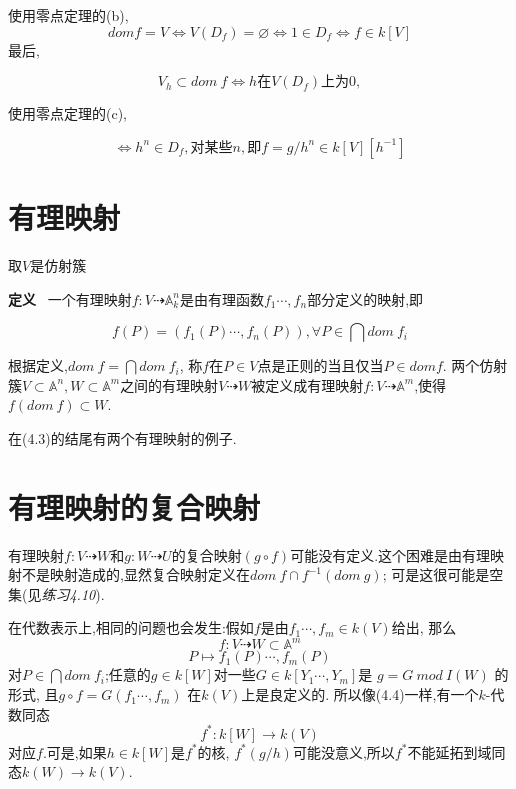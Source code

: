 \documentclass[UTF8]{book}
\begin{document}
		使用零点定理的(b),
		\begin{equation*}
		dom f=V\iff V(D_{f})=\varnothing \iff 1\in D_{f} \iff f\in k[V]
		\end{equation*}
		最后,

	\begin{equation*}
		V_{h}\subset dom \ f \iff h \text{在}V(D_{f})\text{上为}0,
		\end{equation*}

		使用零点定理的(c),
		
		\begin{equation*}\iff h^{n}\in D_{f},\text{对某些} n ,\text{即}f=g/h^{n}\in k[V][h^{-1}]\end{equation*}

	\section{有理映射}取$ V $是仿射簇

		\textbf{定义} \ 一个有理映射$f:V\dashrightarrow \mathbb{A}^{n}_{k}$是由有理函数$f_{1}\cdots ,f_{n}$部分定义的映射,即

		\begin{equation*}
		f(P)=(f_{1}(P)\cdots, f_{n}(P)) ,\forall P\in \bigcap dom \ f_{i}
		\end{equation*}

		根据定义,$dom \ f=\bigcap dom \ f_{i}$, 称$f $在$ P\in V $点是正则的当且仅当$P\in dom f$. 两个仿射簇$V\subset \mathbb{A}^{n},W\subset \mathbb{A}^{m}$之间的有理映射$V\dashrightarrow W$被定义成有理映射$f:V\dashrightarrow \mathbb{A}^{m}$,使得$f(dom \ f)\subset W.$

		在(4.3)的结尾有两个有理映射的例子.

	\section{有理映射的复合映射}
		有理映射$ f:V \dashrightarrow W $和$ g:W \dashrightarrow U $的复合映射$(g\circ f)$可能没有定义.这个困难是由有理映射不是映射造成的,显然复合映射定义在$dom \ f\cap f^{-1}(dom \ g)$; 可是这很可能是空集(见\textit{练习4.10}).

		在代数表示上,相同的问题也会发生:假如$ f $是由$f_{1}\cdots ,f_{m}\in k(V)$给出, 那么
		\begin{equation*}
		f:V \dashrightarrow W\subset \mathbb{A}^{m}
		\end{equation*}
		\begin{equation*}
		P \mapsto f_{1}(P)\cdots, f_{m}(P)
		\end{equation*}
		对$P\in \bigcap dom \ f_{i}$;任意的$g\in k[W]$对一些$G\in k[Y_{1}\cdots,Y_{m}]$是 $g=G \ mod \ I(W)$ 的形式, 且$g\circ f=G(f_{1}\cdots ,f_{m})$ 在$ k(V) $上是良定义的. 所以像(4.4)一样,有一个$ k $-代数同态
		\begin{equation*}
		f^{*}:k[W]\rightarrow k(V)
		\end{equation*}
		对应$ f $.可是,如果$h\in k[W]$是$f^{*}$的核, $f^{*}(g/h)$可能没意义,所以$f^{*}$不能延拓到域同态$k(W)\rightarrow k(V)$.
\end{document}
